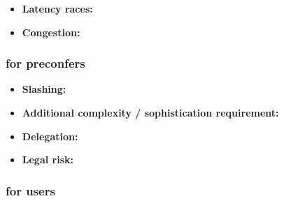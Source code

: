 \documentclass[a4paper]{article}
\theoremstyle{boldstyle}
\begin{document}
\begin{itemize}
        \item \textbf{Latency races:} %
        
        \item \textbf{Congestion:} %
    
    \end{itemize}

    \subsubsection{for preconfers}
    \begin{itemize}
        \item \textbf{Slashing:} %
        
        \item \textbf{Additional complexity / sophistication requirement:} %
        
        \item \textbf{Delegation:} %
        
        \item \textbf{Legal risk:} %
    \end{itemize}
    
    \subsubsection{for users}
\end{document}
